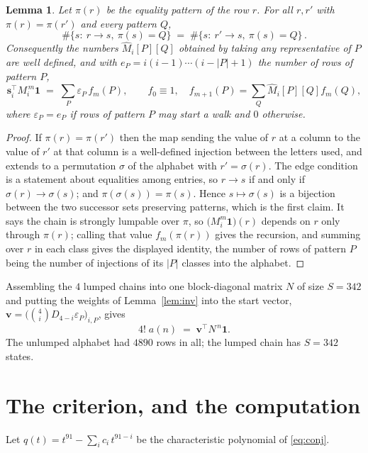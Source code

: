 \documentclass[11pt,a4paper]{article}
\theoremstyle{plain}
\newtheorem{lemma}[theorem]{Lemma}
\theoremstyle{definition}
\begin{document}
\begin{lemma}\label{lem:lump}
Let $\pi(r)$ be the equality pattern of the row $r$. For all $r,r'$ with
$\pi(r)=\pi(r')$ and every pattern $Q$,
\[
\#\{s:\ r\to s,\ \pi(s)=Q\}\;=\;\#\{s:\ r'\to s,\ \pi(s)=Q\}\, .
\]
Consequently the numbers $\widehat M_i[P][Q]$ obtained by taking any representative of $P$
are well defined, and with $e_P=i(i-1)\cdots(i-|P|+1)$ the number of rows of pattern $P$,
\[
\mathbf{s}_i^{\!\top}M_i^{\,m}\mathbf{1}\;=\;\sum_P \varepsilon_P\,f_m(P),
\qquad f_0\equiv1,\quad f_{m+1}(P)=\sum_Q\widehat M_i[P][Q]f_m(Q),
\]
where $\varepsilon_P=e_P$ if rows of pattern $P$ may start a walk and $0$ otherwise.
\end{lemma}

\begin{proof}
If $\pi(r)=\pi(r')$ then the map sending the value of $r$ at a column to the value of $r'$
at that column is a well-defined injection between the letters used, and extends to a
permutation $\sigma$ of the alphabet with $r'=\sigma(r)$. The edge condition is a statement
about equalities among entries, so $r\to s$ if and only if $\sigma(r)\to\sigma(s)$; and
$\pi(\sigma(s))=\pi(s)$. Hence $s\mapsto\sigma(s)$ is a bijection between the two successor
sets preserving patterns, which is the first claim. It says the chain is strongly lumpable
over $\pi$, so $\bigl(M_i^{m}\mathbf{1}\bigr)(r)$ depends on $r$ only through $\pi(r)$;
calling that value $f_m(\pi(r))$ gives the recursion, and summing over $r$ in each class
gives the displayed identity, the number of rows of pattern $P$ being the number of
injections of its $|P|$ classes into the alphabet.
\end{proof}

Assembling the $4$ lumped chains into one block-diagonal matrix $N$ of size $S=342$ and
putting the weights of Lemma~\ref{lem:inv} into the start vector,
$\mathbf{v}=\bigl(\binom{4}{i}D_{4-i}\varepsilon_P\bigr)_{i,P}$, gives
\begin{equation}\label{eq:walk}
4!\;a(n)\;=\;\mathbf{v}^{\!\top}N^{\,n}\mathbf{1} .
\end{equation}
The unlumped alphabet had $4890$ rows in all; the lumped chain has $S=342$ states.

\section{The criterion, and the computation}

Let $q(t)=t^{91}-\sum_i c_i\,t^{91-i}$ be the characteristic polynomial of
\eqref{eq:conj}.
\end{document}
